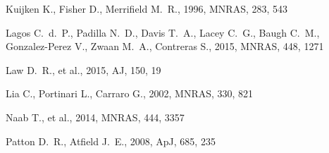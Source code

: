 \documentclass[a4paper,fleqn,usenatbib]{mnras}
\begin{document}
\begin{thebibliography}{}

 Kuijken K., Fisher D., Merrifield M.~R., 1996, MNRAS, 283, 543 


 Lagos C.~d.~P., Padilla N.~D., Davis T.~A., Lacey C.~G., Baugh C.~M., Gonzalez-Perez V., Zwaan M.~A., Contreras S., 2015, MNRAS, 448, 1271 

 Law D.~R., et al., 2015, AJ, 150, 19 



 Lia C., Portinari L., Carraro G., 2002, MNRAS, 330, 821 




 Naab T., et al., 2014, MNRAS, 444, 3357 



 Patton D.~R., Atfield J.~E., 2008, ApJ, 685, 235


\end{thebibliography}
\end{document}
